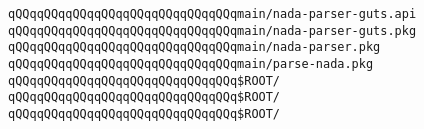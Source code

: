 \verb|qQQqqQQqqQQqqQQqqQQqqQQqqQQqqQQqmain/nada-parser-guts.api|\newline
\verb|qQQqqQQqqQQqqQQqqQQqqQQqqQQqqQQqmain/nada-parser-guts.pkg|\newline
\verb|qQQqqQQqqQQqqQQqqQQqqQQqqQQqqQQqmain/nada-parser.pkg|\newline
\verb|qQQqqQQqqQQqqQQqqQQqqQQqqQQqqQQqmain/parse-nada.pkg|\newline
\newline
\verb|qQQqqQQqqQQqqQQqqQQqqQQqqQQqqQQq$ROOT/|\newline
\newline
\verb|qQQqqQQqqQQqqQQqqQQqqQQqqQQqqQQq$ROOT/|\newline
\newline
\verb|qQQqqQQqqQQqqQQqqQQqqQQqqQQqqQQq$ROOT/|\newline

